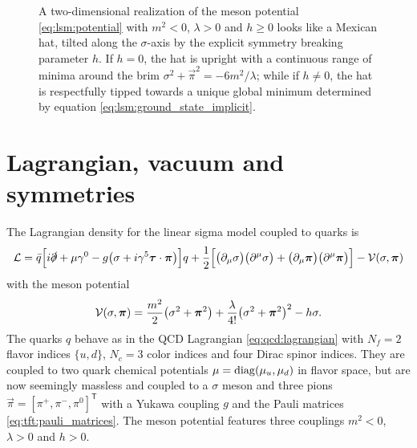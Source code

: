 \begin{figure}
\centering
{}
\caption{\label{fig:lsm:potential}%
	A two-dimensional realization of the meson potential \eqref{eq:lsm:potential} with $m^2<0$, $\lambda>0$ and $h \geq 0$ looks like a Mexican hat, tilted along the $\sigma$-axis by the explicit symmetry breaking parameter $h$.
	If $h = 0$, the hat is upright with a continuous range of minima around the brim $\sigma^2 + \vec\pi^2 = -6m^2 / \lambda$;
	while if $h \neq 0$, the hat is respectfully tipped towards a unique global minimum determined by equation \eqref{eq:lsm:ground_state_implicit}.
}
\end{figure}

\section{Lagrangian, vacuum and symmetries}
\label{sec:lsm:vacuum}

The Lagrangian density for the linear sigma model coupled to quarks is \cite{ref:lsm_2f}
\begin{equation}
	\mathcal{L} = \bar{q} \Big[ i \slashed\partial + \mu \gamma^0 - g \big( \sigma + i \gamma^5 {\bm{\tau}} \cdot {\bm{\pi}} \big) \Big] q
	      + \frac12 \Big[ \big( \partial_\mu \sigma \big) \big( \partial^\mu \sigma \big) + \big( \partial_\mu {\bm{\pi}} \big) \big( \partial^\mu {\bm{\pi}} \big) \Big] - \mathcal{V}(\sigma,{\bm{\pi}})
\label{eq:lsm:lagrangian}
\end{equation}
with the meson potential
\begin{equation}
	\mathcal{V}(\sigma, {\bm{\pi}}) = \frac{m^2}{2} \big( \sigma^2 + {\bm{\pi}}^2 \big) + \frac{\lambda}{4!} \big( \sigma^2 + {\bm{\pi}}^2 \big)^2 - h \sigma .
\label{eq:lsm:potential}
\end{equation}
The quarks $q$ behave as in the QCD Lagrangian \eqref{eq:qcd:lagrangian} with $N_f=2$ flavor indices $\{u,d\}$, $N_c=3$ color indices and four Dirac spinor indices.
They are coupled to two quark chemical potentials $\mu = \operatorname{diag} (\mu_u, \mu_d)$ in flavor space,
but are now seemingly massless and coupled to a $\sigma$ meson and three pions $\vec\pi = [\pi^+, \pi^-, \pi^0]^\mathsf{T}$ with a Yukawa coupling $g$ and the Pauli matrices \eqref{eq:tft:pauli_matrices}.
The meson potential features three couplings $m^2<0$, $\lambda>0$ and $h>0$.

